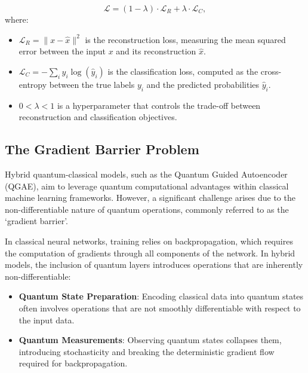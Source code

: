 \documentclass[conference]{IEEEtran}
\begin{document}
\begin{equation}
    \mathcal{L} = (1-\lambda) \cdot \mathcal{L}_R + \lambda \cdot \mathcal{L}_{C},
    \label{eq:composed_loss_function}
\end{equation}
where:
\begin{itemize}
    \item \( \mathcal{L}_R = \| x - \hat{x} \|^2 \) is the reconstruction loss, measuring the mean squared error between the input \( x \) and its reconstruction \( \hat{x} \).
    \item \( \mathcal{L}_C = -\sum_i y_i \log(\hat{y}_i) \) is the classification loss, computed as the cross-entropy between the true labels \( y_i \) and the predicted probabilities \( \hat{y}_i \).
    \item \( 0 < \lambda < 1 \) is a hyperparameter that controls the trade-off between reconstruction and classification objectives.
\end{itemize}    



\subsection{The Gradient Barrier Problem}
Hybrid quantum-classical models, such as the Quantum Guided Autoencoder 
(QGAE), aim to leverage quantum computational advantages within 
classical machine learning frameworks. However, a significant 
challenge arises due to the non-differentiable nature of quantum 
operations, commonly referred to as the `gradient barrier'.

In classical neural networks, training relies on backpropagation, 
which requires the computation of gradients through all components 
of the network. In hybrid models, the inclusion of quantum 
layers introduces operations that are inherently non-differentiable:

\begin{itemize}
    \item \textbf{Quantum State Preparation}: 
    Encoding classical data into 
    quantum states often involves operations 
    that are not smoothly differentiable with 
    respect to the input data.
    
    \item \textbf{Quantum Measurements}:
    Observing quantum states collapses them, 
    introducing stochasticity and breaking the 
    deterministic gradient flow required 
    for backpropagation.
\end{itemize}
\end{document}
